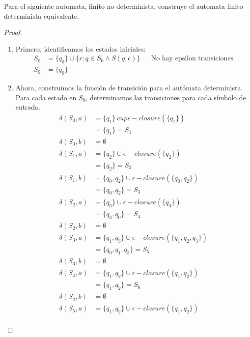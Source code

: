 \begin{Pro}
    Para el siguiente automata, finito no determinista, construye el automata finito determinista equivalente.
\end{Pro}

\begin{proof}
    \begin{enumerate}
        \item Primero, identificamos los estados iniciales: 
        \begin{align*}
            S_0 &= \{q_0\} \cup \{r: q \in S_0 \land S(q,\epsilon)\} && \text{No hay epsilon transiciones}\\ 
            S_0 &= \{q_0\}
        \end{align*}
        \item Ahora, construimos la función de transición para el autómata determinista. Para cada estado en $S_0$, 
        determinamos las transiciones para cada símbolo de entrada.
        \begin{align*}
            \delta(S_0,a) &= \{q_1\}\ cup \epsilon-closure(\{q_1\}) \\ 
           &= \{q_1\} = S_1 \\
            \delta(S_0,b) &= \emptyset \\ 
            \delta(S_1,a) &= \{q_2\} \cup \epsilon-closure(\{q_2\}) \\
            &= \{q_2\} = S_2 \\
            \delta(S_1,b) &= \{q_0,q_2\} \cup \epsilon-closure(\{q_0,q_2\}) \\
            &= \{q_0,q_2\} = S_3 \\
            \delta(S_2,a) &= \{q_3\} \cup \epsilon-closure(\{q_3\}) \\
            &= \{q_3,q_0\} = S_4 \\
            \delta(S_2,b) &= \emptyset \\ 
            \delta(S_3,a) &= \{q_1,q_3\} \cup \epsilon-closure(\{q_1,q_2,q_3\}) \\
            &= \{q_0,q_1,q_3\} = S_5 \\
            \delta(S_3,b) &= \emptyset \\ 
            \delta(S_4,a) &= \{q_1,q_2\} \cup \epsilon-closure(\{q_1,q_2\}) \\
            &= \{q_1,q_2\} = S_6 \\
            \delta(S_4,b) &= \emptyset \\ 
            \delta(S_5,a) &= \{q_1,q_2\} \cup \epsilon-closure(\{q_1,q_2\}) \\

\end{align*}
\end{enumerate}
\end{proof}
